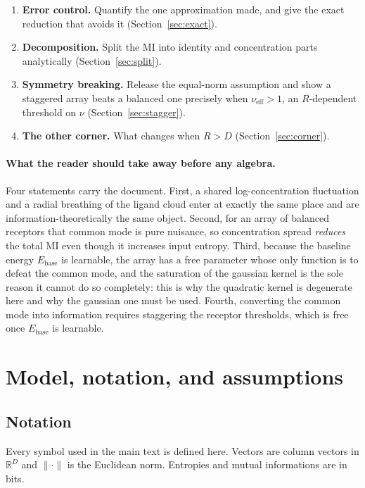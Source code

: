\documentclass[11pt,a4paper]{article}
\newcommand{\RR}{\mathbb{R}}
\newcommand{\Ebase}{E_{\mathrm{base}}}
\begin{document}
\begin{enumerate}
        (Section~\ref{sec:limits}).
  \item \textbf{Error control.} Quantify the one approximation made, and give the exact
        reduction that avoids it (Section~\ref{sec:exact}).
  \item \textbf{Decomposition.} Split the MI into identity and concentration parts
        analytically (Section~\ref{sec:split}).
  \item \textbf{Symmetry breaking.} Release the equal-norm assumption and show a
        staggered array beats a balanced one precisely when $\nu_{\mathrm{eff}} > 1$,
        an $R$-dependent threshold on $\nu$ (Section~\ref{sec:stagger}).
  \item \textbf{The other corner.} What changes when $R > D$
        (Section~\ref{sec:corner}).
\end{enumerate}

\paragraph{What the reader should take away before any algebra.}
Four statements carry the document. First, a shared log-concentration fluctuation and a
radial breathing of the ligand cloud enter at exactly the same place and are
information-theoretically the same object. Second, for an array of balanced receptors
that common mode is pure nuisance, so concentration spread \emph{reduces} the total MI
even though it increases input entropy. Third, because the baseline energy $\Ebase$ is
learnable, the array has a free parameter whose only function is to defeat the common
mode, and the saturation of the gaussian kernel is the sole reason it cannot do so
completely: this is why the quadratic kernel is degenerate here and why the gaussian one
must be used. Fourth, converting the common mode into information requires staggering
the receptor thresholds, which is free once $\Ebase$ is learnable.

\section{Model, notation, and assumptions}
\label{sec:model}

\subsection{Notation}

Every symbol used in the main text is defined here. Vectors are column vectors in
$\RR^D$ and $\|\cdot\|$ is the Euclidean norm. Entropies and mutual informations are in
bits.
\end{document}
